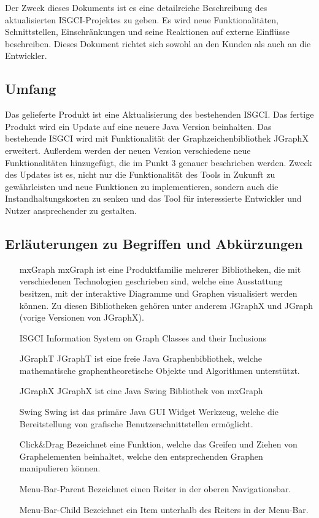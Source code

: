 \documentclass[11pt,a4paper]{article}
\begin{document}
	Der Zweck dieses Dokuments ist es eine detailreiche Beschreibung des aktualisierten ISGCI-Projektes zu geben. Es wird neue Funktionalitäten, Schnittstellen, Einschränkungen und seine Reaktionen auf externe Einflüsse beschreiben. Dieses Dokument richtet sich sowohl an den Kunden als auch an die Entwickler.
	

  	\subsection{Umfang} %
   Das gelieferte Produkt ist eine Aktualisierung des bestehenden ISGCI. Das fertige Produkt wird ein Update auf eine neuere Java Version beinhalten. Das bestehende ISGCI wird mit Funktionalität der Graphzeichenbibliothek JGraphX erweitert. Außerdem werden der neuen Version verschiedene neue Funktionalitäten hinzugefügt, die im Punkt 3 genauer beschrieben werden. Zweck des Updates ist es, nicht nur die Funktionalität des Tools in Zukunft zu gewährleisten und neue Funktionen zu implementieren, sondern auch die Instandhaltungskosten zu senken und das Tool für interessierte Entwickler und Nutzer ansprechender zu gestalten.

  	\subsection{Erläuterungen zu Begriffen und Abkürzungen} %

	        \begin{itemize}
	        \item[mxGraph] mxGraph ist eine Produktfamilie mehrerer Bibliotheken, die mit verschiedenen Technologien geschrieben sind, welche eine Ausstattung besitzen, mit der interaktive Diagramme und Graphen visualisiert werden können. Zu diesen Bibliotheken gehören unter anderem JGraphX und JGraph (vorige Versionen von JGraphX).
	        \item[ISGCI] Information System on Graph Classes and their Inclusions
	        \item[JGraphT] JGraphT ist eine freie Java Graphenbibliothek, welche mathematische graphentheoretische Objekte und Algorithmen unterstützt. 
	        \item[JGraphX] JGraphX ist eine Java Swing Bibliothek von mxGraph
	        \item[Swing] Swing ist das primäre Java GUI Widget Werkzeug, welche die Bereitstellung von grafische Benutzerschnittstellen ermöglicht.
	        \item[Click\&Drag] Bezeichnet eine Funktion, welche das Greifen und Ziehen von Graphelementen beinhaltet, welche den entsprechenden Graphen manipulieren können.
	        \item[Menu-Bar-Parent] Bezeichnet einen Reiter in der oberen Navigationsbar.
	        \item[Menu-Bar-Child] Bezeichnet ein Item unterhalb des Reiters in der Menu-Bar.
	        \end{itemize}
	        
\end{document}
